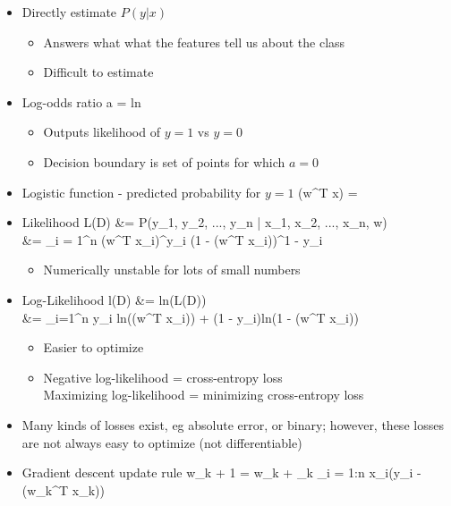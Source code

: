 \documentclass[12pt]{article}
\newenvironment{eqn}{\equation\alignedat{3}}{\endalignedat\endequation}
\begin{document}
\begin{itemize}
	\item Directly estimate $P(y | x)$
	\begin{itemize}
		\item Answers what what the features tell us about the class
		\item Difficult to estimate
	\end{itemize}
	\item Log-odds ratio
	\begin{eqn}
		a = ln 
	\end{eqn}
	\begin{itemize}
		\item Outputs likelihood of $y = 1$ vs $y = 0$
		\item Decision boundary is set of points for which $a = 0$
	\end{itemize}
	\item Logistic function - predicted probability for $y = 1$
	\begin{eqn}
		\sigma(w^T x) = 
	\end{eqn}
	\item Likelihood
	\begin{eqn}
		L(D) &= P(y_1, y_2, ..., y_n | x_1, x_2, ..., x_n, w) \\
		&= \prod_{i = 1}^n \sigma(w^T x_i)^{y_i} (1 - \sigma(w^T x_i))^{1 - y_i}
	\end{eqn}
	\begin{itemize}
		\item Numerically unstable for lots of small numbers
	\end{itemize}
	\item Log-Likelihood
	\begin{eqn}
		l(D) &= ln(L(D)) \\
		&= \Sigma_{i=1}^n y_i ln(\sigma(w^T x_i)) + (1 - y_i)ln(1 - \sigma(w^T x_i))
	\end{eqn}
	\begin{itemize}
		\item Easier to optimize
		\item Negative log-likelihood = cross-entropy loss \\
		Maximizing log-likelihood = minimizing cross-entropy loss
	\end{itemize}
	\item Many kinds of losses exist, eg absolute error, or binary; 
	however, these losses are not always easy to optimize (not differentiable)
	\item Gradient descent update rule
	\begin{eqn}
		w_{k + 1} = w_k + \alpha_k \Sigma_{i = 1:n} x_i(y_i - \sigma(w_k^T x_k))
	\end{eqn}
\end{itemize}
\end{document}

